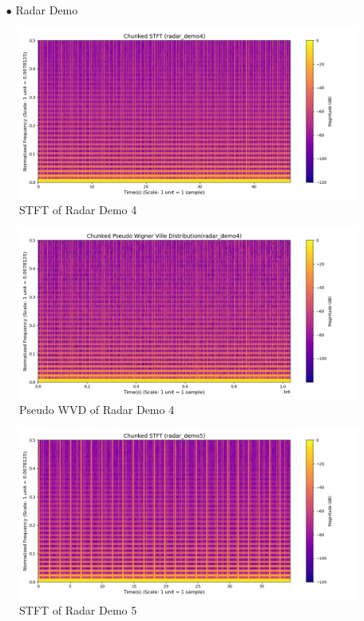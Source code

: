 \documentclass[12pt,a4paper,onecolumn]{exam}
\begin{document}
\begin{solution}
      \begin{itemize}
      \item[$\bullet$] Radar Demo
      \end{itemize}

        \begin{figure}[H]
        \centering
        \includegraphics[scale = 0.45]{radar_demo4_stft.png}
        \caption{STFT of Radar Demo 4}
        \label{fig:47}
        \end{figure}

        \begin{figure}[H]
        \centering
        \includegraphics[scale = 0.45]{radar_demo4_pwvd.png}
        \caption{Pseudo WVD of Radar Demo 4}
        \label{fig:48}
        \end{figure}    

        \begin{figure}[H]
        \centering
        \includegraphics[scale = 0.45]{radar_demo5_stft.png}
        \caption{STFT of Radar Demo 5}
        \label{fig:49}
        \end{figure}


\end{solution}
\end{document}
